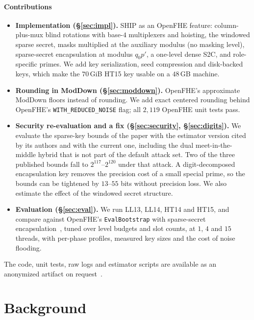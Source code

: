 \documentclass[sigconf,nonacm]{acmart}
\newcommand{\coderef}{\ifdefined\shipanonymous{} as an anonymized artifact on request\else~\cite{ShipCode}\fi}
\begin{document}
\paragraph{Contributions}
\begin{itemize}
\item \textbf{Implementation (\S\ref{sec:impl}).} SHIP as an OpenFHE feature: column-plus-mux blind rotations with base-$4$ multiplexers and hoisting, the windowed sparse secret, masks multiplied at the auxiliary modulus (no masking level), sparse-secret encapsulation at modulus $q_0p'$, a one-level dense S2C, and role-specific primes. We add key serialization, seed compression and disk-backed keys, which make the $70$\,GiB HT15 key usable on a $48$\,GB machine.
\item \textbf{Rounding in ModDown (\S\ref{sec:moddown}).} OpenFHE's approximate ModDown floors instead of rounding. We add exact centered rounding behind OpenFHE's \texttt{WITH\_REDUCED\_NOISE} flag; all $2{,}119$ OpenFHE unit tests pass.
\item \textbf{Security re-evaluation and a fix (\S\ref{sec:security}, \S\ref{sec:digits}).} We evaluate the sparse-key bounds of the paper with the estimator version cited by its authors and with the current one, including the dual meet-in-the-middle hybrid that is not part of the default attack set. Two of the three published bounds fall to $2^{117}$--$2^{120}$ under that attack. A digit-decomposed encapsulation key removes the precision cost of a small special prime, so the bounds can be tightened by $13$--$55$ bits without precision loss. We also estimate the effect of the windowed secret structure.
\item \textbf{Evaluation (\S\ref{sec:eval}).} We run LL13, LL14, HT14 and HT15, and compare against OpenFHE's \texttt{EvalBootstrap} with sparse-secret encapsulation~\cite{BTH22}, tuned over level budgets and slot counts, at $1$, $4$ and $15$ threads, with per-phase profiles, measured key sizes and the cost of noise flooding.
\end{itemize}
The code, unit tests, raw logs and estimator scripts are available\coderef.

\section{Background}
\label{sec:background}
\end{document}
